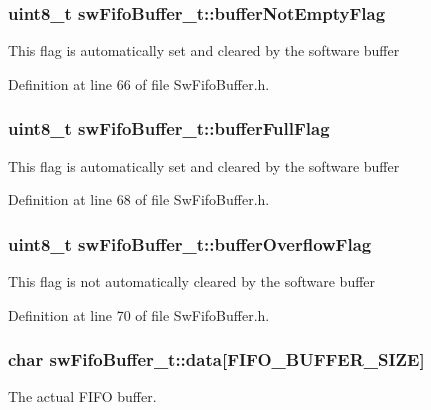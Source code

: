 \subsubsection[{buffer\+Not\+Empty\+Flag}]{\setlength{\rightskip}{0pt plus 5cm}uint8\+\_\+t sw\+Fifo\+Buffer\+\_\+t\+::buffer\+Not\+Empty\+Flag}\label{structsw_fifo_buffer__t_a5c7c40846fb9a0ce25dba8e99824ad8a}
This flag is automatically set and cleared by the software buffer 

Definition at line 66 of file Sw\+Fifo\+Buffer.\+h.

\hypertarget{structsw_fifo_buffer__t_a8c291f4e2fda846402115081e5a750e7}{}
\subsubsection[{buffer\+Full\+Flag}]{\setlength{\rightskip}{0pt plus 5cm}uint8\+\_\+t sw\+Fifo\+Buffer\+\_\+t\+::buffer\+Full\+Flag}\label{structsw_fifo_buffer__t_a8c291f4e2fda846402115081e5a750e7}
This flag is automatically set and cleared by the software buffer 

Definition at line 68 of file Sw\+Fifo\+Buffer.\+h.

\hypertarget{structsw_fifo_buffer__t_a9bbab1b668fb5a7f96f07478634a50f6}{}
\subsubsection[{buffer\+Overflow\+Flag}]{\setlength{\rightskip}{0pt plus 5cm}uint8\+\_\+t sw\+Fifo\+Buffer\+\_\+t\+::buffer\+Overflow\+Flag}\label{structsw_fifo_buffer__t_a9bbab1b668fb5a7f96f07478634a50f6}
This flag is not automatically cleared by the software buffer 

Definition at line 70 of file Sw\+Fifo\+Buffer.\+h.

\hypertarget{structsw_fifo_buffer__t_a0b595a1d13af47083fedafee8e29e26e}{}
\subsubsection[{data}]{\setlength{\rightskip}{0pt plus 5cm}char sw\+Fifo\+Buffer\+\_\+t\+::data\mbox{[}{\bf F\+I\+F\+O\+\_\+\+B\+U\+F\+F\+E\+R\+\_\+\+S\+I\+Z\+E}\mbox{]}}\label{structsw_fifo_buffer__t_a0b595a1d13af47083fedafee8e29e26e}
The actual F\+I\+F\+O buffer. 

